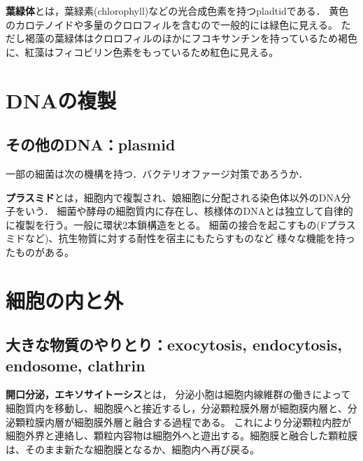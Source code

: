 \documentclass[uplatex, dvipdfmx]{jsreport}
\begin{document}
\begin{definition}[chloroplast]
    \textbf{葉緑体}とは，葉緑素(chlorophyll)などの光合成色素を持つpladtidである．
    黄色のカロテノイドや多量のクロロフィルを含むので一般的には緑色に見える。
    ただし褐藻の葉緑体はクロロフィルのほかにフコキサンチンを持っているため褐色に、紅藻はフィコビリン色素をもっているため紅色に見える。
\end{definition}

\section{DNAの複製}

\subsection{その他のDNA：plasmid}

一部の細菌は次の機構を持つ．バクテリオファージ対策であろうか．

\begin{definition}[plasmid]
    \textbf{プラスミド}とは，細胞内で複製され、娘細胞に分配される染色体以外のDNA分子をいう．
    細菌や酵母の細胞質内に存在し、核様体のDNAとは独立して自律的に複製を行う。一般に環状2本鎖構造をとる。 細菌の接合を起こすもの(Fプラスミドなど)、抗生物質に対する耐性を宿主にもたらすものなど
    様々な機能を持ったものがある。
\end{definition}

\section{細胞の内と外}
\subsection{大きな物質のやりとり：exocytosis, endocytosis, endosome, clathrin}

\begin{definition}[exocytosis]
    \textbf{開口分泌，エキソサイトーシス}とは，
    分泌小胞は細胞内線維群の働きによって細胞質内を移動し、細胞膜へと接近するし，分泌顆粒膜外層が細胞膜内層と、分泌顆粒膜内層が細胞膜外層と融合する過程である。
    これにより分泌顆粒内腔が細胞外界と連絡し、顆粒内容物は細胞外へと遊出する。細胞膜と融合した顆粒膜は、そのまま新たな細胞膜となるか、細胞内へ再び戻る。
\end{definition}
\end{document}
